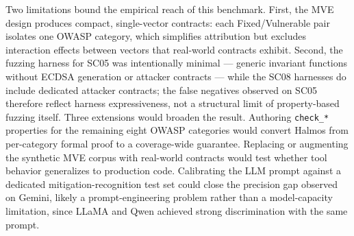 Two limitations bound the empirical reach of this benchmark. First, the MVE design produces compact, single-vector contracts: each Fixed/Vulnerable pair isolates one OWASP category, which simplifies attribution but excludes interaction effects between vectors that real-world contracts exhibit. Second, the fuzzing harness for SC05 was intentionally minimal — generic invariant functions without ECDSA generation or attacker contracts — while the SC08 harnesses do include dedicated attacker contracts; the false negatives observed on SC05 therefore reflect harness expressiveness, not a structural limit of property-based fuzzing itself. Three extensions would broaden the result. Authoring \texttt{check\_*} properties for the remaining eight OWASP categories would convert Halmos from per-category formal proof to a coverage-wide guarantee. Replacing or augmenting the synthetic MVE corpus with real-world contracts would test whether tool behavior generalizes to production code. Calibrating the LLM prompt against a dedicated mitigation-recognition test set could close the precision gap observed on Gemini, likely a prompt-engineering problem rather than a model-capacity limitation, since LLaMA and Qwen achieved strong discrimination with the same prompt.